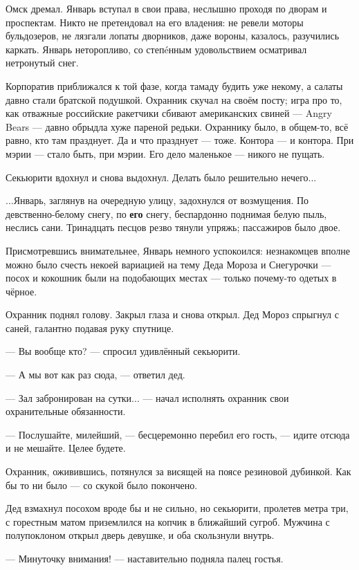 Омск дремал.
Январь вступал в свои права, неслышно проходя по дворам и проспектам.
Никто не претендовал на его владения: не ревели моторы бульдозеров,
не лязгали лопаты дворников, даже вороны, казалось, разучились каркать.
Январь неторопливо, со степ\'eнным удовольствием осматривал нетронутый снег.

Корпоратив приближался к той фазе, когда тамаду будить уже некому, а салаты давно стали братской подушкой.
Охранник скучал на своём посту; игра про то, как отважные российские ракетчики сбивают американских свиней ---
Angry Bears --- давно обрыдла хуже пареной редьки. Охраннику было, в общем-то, всё равно, кто там празднует.
Да и что празднует --- тоже. Контора --- и контора. При мэрии --- стало быть, при мэрии.
Его дело маленькое --- никого не пущать.

Секьюрити вдохнул и снова выдохнул. Делать было решительно нечего...

...Январь, заглянув на очередную улицу, задохнулся от возмущения.
По девственно-белому снегу, по \textbf{его} снегу, беспардонно поднимая белую пыль, неслись сани.
Тринадцать песцов резво тянули упряжь; пассажиров было двое.

Присмотревшись внимательнее, Январь немного успокоился:
незнакомцев вполне можно было счесть некоей вариацией на тему Деда Мороза и Снегурочки ---
посох и кокошник были на подобающих местах --- только почему-то одетых в чёрное.

Охранник поднял голову. Закрыл глаза и снова открыл.
Дед Мороз спрыгнул с саней, галантно подавая руку спутнице.

 --- Вы вообще кто? --- спросил удивлённый секьюрити.

 --- А мы вот как раз сюда, --- ответил дед.

 --- Зал забронирован на сутки... --- начал исполнять охранник свои охранительные обязанности.

 --- Послушайте, милейший, --- бесцеремонно перебил его гость, --- идите отсюда и не мешайте. Целее будете.

Охранник, оживившись, потянулся за висящей на поясе резиновой дубинкой.
Как бы то ни было --- со скукой было покончено.

Дед взмахнул посохом вроде бы и не сильно, но секьюрити, пролетев метра три,
с горестным матом приземлился на копчик в ближайший сугроб.
Мужчина с полупоклоном открыл дверь девушке, и оба скользнули внутрь.

 --- Минуточку внимания! --- наставительно подняла палец гостья.

